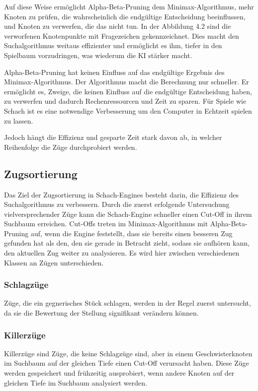 Auf diese Weise ermöglicht Alpha-Beta-Pruning dem Minimax-Algorithmus, mehr Knoten zu prüfen, 
die wahrscheinlich die endgültige Entscheidung beeinflussen, und Knoten zu verwerfen, die das nicht tun. 
In der Abbildung 4.2 sind die verworfenen Knotenpunkte mit Fragezeichen gekennzeichnet.
Dies macht den Suchalgorithmus weitaus effizienter und ermöglicht es ihm, tiefer in den Spielbaum vorzudringen, was wiederum die KI stärker macht.

Alpha-Beta-Pruning hat keinen Einfluss auf das endgültige Ergebnis des Minimax-Algorithmus. Der Algorithmus macht die Berechnung nur schneller. 
Er ermöglicht es, Zweige, die keinen Einfluss auf die endgültige Entscheidung haben, zu verwerfen und dadurch Rechenressourcen und Zeit zu sparen. 
Für Spiele wie Schach ist es eine notwendige Verbesserung um den Computer in Echtzeit spielen zu lassen.

Jedoch hängt die Effizienz und gesparte Zeit stark davon ab, in welcher Reihenfolge die Züge durchprobiert werden.~\cite{Aayush_Parashar_2023_springer}

\subsection{Zugsortierung}  
Das Ziel der Zugsortierung in Schach-Engines besteht darin, die Effizienz des Suchalgorithmus zu verbessern.
Durch die zuerst erfolgende Untersuchung vielversprechender Züge kann die Schach-Engine schneller einen Cut-Off in ihrem Suchbaum erreichen. 
Cut-Offs treten im Minimax-Algorithmus mit Alpha-Beta-Pruning auf, wenn die Engine feststellt, dass sie bereits einen besseren Zug gefunden hat als den, 
den sie gerade in Betracht zieht, sodass sie aufhören kann, den aktuellen Zug weiter zu analysieren.
Es wird hier zwischen verschiedenen Klassen an Zügen unterschieden.~\cite{Move_Ordering_2023_chessprogramming}

\subsubsection{Schlagzüge}
Züge, die ein gegnerisches Stück schlagen, werden in der Regel zuerst untersucht, da sie die Bewertung der 
Stellung signifikant verändern können.~\cite{Move_Ordering_2023_chessprogramming}

\subsubsection{Killerzüge}
Killerzüge sind Züge, die keine Schlagzüge sind, aber in einem Geschwisterknoten im Suchbaum auf der gleichen Tiefe einen Cut-Off verursacht haben. 
Diese Züge werden gespeichert und frühzeitig ausprobiert, wenn andere Knoten auf der gleichen Tiefe im Suchbaum analysiert werden.~\cite{Move_Ordering_2023_chessprogramming}

